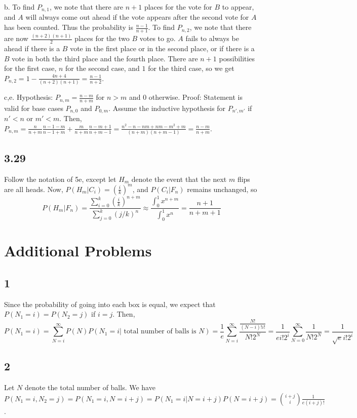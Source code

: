 \documentclass{article}
\begin{document}
b. To find $P_{n,1}$, we note that there are $n+1$ places for the vote for $B$ to appear, and $A$ will always come out ahead if the vote appears after the second vote for $A$ has been counted. Thus the probability is $\frac{n-1}{n+1}$. To find $P_{n,2}$, we note that there are now $\frac{(n+2)(n+1)}{2}$ places for the two $B$ votes to go. $A$ fails to always be ahead if there is a $B$ vote in the first place or in the second place, or if there is a $B$ vote in both the third place and the fourth place. There are $n+1$ possibilities for the first case, $n$ for the second case, and $1$ for the third case, so we get $P_{n,2}=1-\frac{4n+4}{(n+2)(n+1)}=\frac{n-1}{n+2}$.

c,e. Hypothesis: $P_{n,m}=\frac{n-m}{n+m}$ for $n>m$ and $0$ otherwise. Proof: Statement is valid for base cases $P_{n,0}$ and $P_{0,m}$. Assume the inductive hypothesis for $P_{n',m'}$ if $n'<n$ or $m'<m$. Then, $P_{n,m}=\frac{n}{n+m}\frac{n-1-m}{n-1+m}+\frac{m}{n+m}\frac{n-m+1}{n+m-1}=\frac{n^2-n-nm+nm-m^2+m}{(n+m)(n+m-1)}=\frac{n-m}{n+m}$.
\subsection*{3.29}
Follow the notation of 5e, except let $H_m$ denote the event that the next $m$ flips are all heads. Now, $P(H_m|C_i)=\left(\frac{i}{k}\right)^m$, and $P(C_i|F_n)$ remains unchanged, so
$$P(H_m|F_n)=\frac{\sum_{i=0}^k\left(\frac{i}{k}\right)^{n+m}}{\sum_{j=0}^k(j/k)^n}\approx\frac{\int_0^1x^{n+m}}{\int_0^1x^n}=\frac{n+1}{n+m+1}$$
\section*{Additional Problems}
\subsection*{1}
Since the probability of going into each box is equal, we expect that $P(N_1=i)=P(N_2=j)$ if $i=j$. Then, 
$$P(N_1=i)=\sum_{N=i}^\infty P(N)P(N_1=i|\text{ total number of balls is }N)=\frac{1}{e}\sum_{N=i}^\infty\frac{\frac{N!}{(N-i)!i!}}{N!2^N}=\frac{1}{ei!2^i}\sum_{N=0}^\infty\frac{1}{N!2^{N}}=\frac{1}{\sqrt{e}i!2^i}$$
\subsection*{2}
Let $N$ denote the total number of balls. We have $P(N_1=i,N_2=j)=P(N_1=i,N=i+j)=P(N_1=i|N=i+j)P(N=i+j)=\binom{i+j}{i}\frac{1}{e(i+j)!}$.
\end{document}
